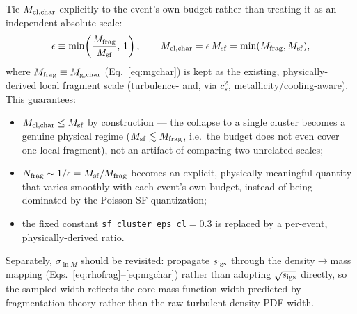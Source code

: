 \documentclass[11pt]{article}
\newcommand{\code}[1]{\texttt{#1}}
\begin{document}
Tie $M_{\rm cl,char}$ explicitly to the event's own budget rather than
treating it as an independent absolute scale:
\[
\epsilon \equiv \min\!\left(\frac{M_{\rm frag}}{M_{\rm sf}},\,1\right),
\qquad
M_{\rm cl,char} = \epsilon \, M_{\rm sf} = \min(M_{\rm frag}, M_{\rm sf}),
\]
where $M_{\rm frag} \equiv M_{\rm g,char}$ (Eq.~\ref{eq:mgchar}) is kept as
the existing, physically-derived local fragment scale (turbulence- and,
via $c_s^2$, metallicity/cooling-aware). This guarantees:
\begin{itemize}
  \item $M_{\rm cl,char} \le M_{\rm sf}$ by construction --- the collapse
        to a single cluster becomes a genuine physical regime ($M_{\rm sf}
        \lesssim M_{\rm frag}$, i.e.\ the budget does not even cover one
        local fragment), not an artifact of comparing two unrelated
        scales;
  \item $N_{\rm frag} \sim 1/\epsilon = M_{\rm sf}/M_{\rm frag}$ becomes an
        explicit, physically meaningful quantity that varies smoothly with
        each event's own budget, instead of being dominated by the
        Poisson SF quantization;
  \item the fixed constant \code{sf\_cluster\_eps\_cl}$=0.3$ is replaced by
        a per-event, physically-derived ratio.
\end{itemize}
Separately, $\sigma_{\ln M}$ should be revisited: propagate $s_{\rm igs}$
through the density$\to$mass mapping (Eqs.~\ref{eq:rhofrag}--\ref{eq:mgchar})
rather than adopting $\sqrt{s_{\rm igs}}$ directly, so the sampled width
reflects the core mass function width predicted by fragmentation theory
rather than the raw turbulent density-PDF width.
\end{document}
